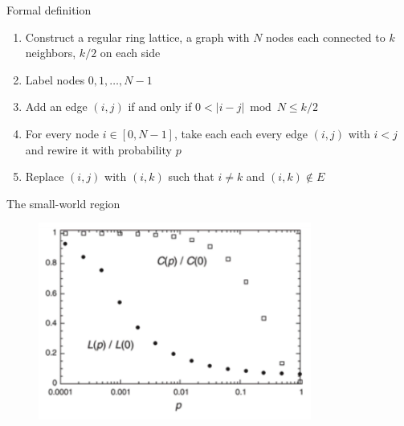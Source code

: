 \begin{frame}{Formal definition}
	
\begin{definition}
\begin{enumerate}
\item Construct a regular ring lattice, a graph with $N$ nodes each connected to $k$ neighbors, $k/2$ on each side
  \BI
  \item Label nodes $0, 1, \ldots, N-1$
  \item Add an edge $(i,j)$ if and only if $0 < |i-j| \bmod N \leq k/2$
  \EI
\item For every node $i \in [0, N-1]$, take each each every edge $(i,j)$ with $i<j$ and rewire it with probability $p$
  \BI
  \item Replace $(i,j)$ with $(i,k)$ such that $i \neq k$ and $(i,k) \notin E$ 
  \EI
\end{enumerate}
\end{definition}


\end{frame}

\begin{frame}{The small-world region}

\begin{figure}
	\includegraphics[width=0.8\textwidth]{watts-sim}
\end{figure}
	
\end{frame}

